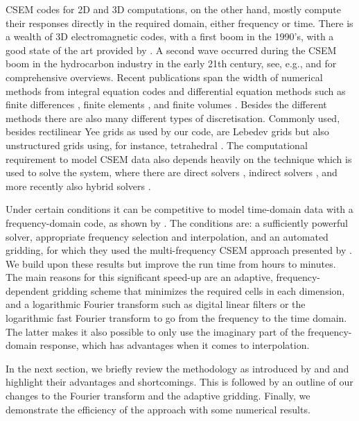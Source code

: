 \documentclass[onecolumn,extra,referee,camera]{gji}
\begin{document}
CSEM codes for 2D and 3D computations, on the other hand, mostly compute their
responses directly in the required domain, either frequency or time. There is a
wealth of 3D electromagnetic codes, with a first boom in the 1990's, with a
good state of the art provided by \cite{B.SEG.99.Oristaglio}. A second wave
occurred during the CSEM boom in the hydrocarbon industry in the early 21th
century, see, e.g., \cite{SG.05.Avdeev} and \cite{SG.10.Borner} for
comprehensive overviews. Recent publications span the width of numerical
methods from integral equation codes \citep{MGS.17.Kruglyakov} and differential
equation methods such as finite differences \citep{CAG.13.Sommer}, finite
elements \citep{GJI.13.Grayver}, and finite volumes \citep{GEO.14.Jahandari}.
Besides the different methods there are also many different types of
discretisation. Commonly used, besides rectilinear Yee grids
\citep{IEEE.66.Yee} as used by our code, are Lebedev grids
\citep{CMMP.64.Lebedev} but also unstructured grids using, for instance,
tetrahedral \citep{CAG.17.Cai}. The computational requirement to model CSEM
data also depends heavily on the technique which is used to solve the system,
where there are direct solvers \citep{GEO.15.Grayver}, indirect solvers
\citep{GJI.15.Jaysaval}, and more recently also hybrid solvers
\citep{GEO.18.Liu}.

Under certain conditions it can be competitive to model time-domain data with a
frequency-domain code, as shown by \cite{GEO.08.Mulder}. The conditions are: a
sufficiently powerful solver, appropriate frequency selection and
interpolation, and an automated gridding, for which they used the
multi-frequency CSEM approach presented by \cite{GEO.07.Plessix}. We build upon
these results but improve the run time from hours to minutes. The main reasons
for this significant speed-up are an adaptive, frequency-dependent gridding
scheme that minimizes the required cells in each dimension, and a logarithmic
Fourier transform such as digital linear filters \citep[DLF, ][]{GP.71.Ghosh}
or the logarithmic fast Fourier transform \citep[FFTLog, ][]{RAS.00.Hamilton}
to go from the frequency to the time domain. The latter makes it also possible
to only use the imaginary part of the frequency-domain response, which has
advantages when it comes to interpolation.

In the next section, we briefly review the methodology as introduced by
\cite{GEO.07.Plessix} and \cite{GEO.08.Mulder} and highlight their advantages
and shortcomings. This is followed by an outline of our changes to the Fourier
transform and the adaptive gridding. Finally, we demonstrate the efficiency of
the approach with some numerical results.
\end{document}
